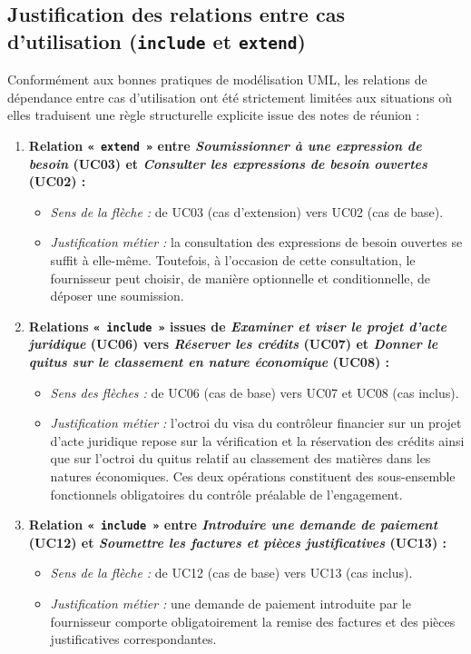 \subsection{Justification des relations entre cas d'utilisation (\texttt{include} et \texttt{extend})}

Conformément aux bonnes pratiques de modélisation UML, les relations de dépendance entre cas d'utilisation ont été strictement limitées aux situations où elles traduisent une règle structurelle explicite issue des notes de réunion :

\begin{enumerate}
  \item \textbf{Relation \texttt{« extend »} entre \emph{Soumissionner à une expression de besoin} (UC03) et \emph{Consulter les expressions de besoin ouvertes} (UC02) :}
  \begin{itemize}
    \item \emph{Sens de la flèche :} de UC03 (cas d'extension) vers UC02 (cas de base).
    \item \emph{Justification métier :} la consultation des expressions de besoin ouvertes se suffit à elle-même. Toutefois, à l'occasion de cette consultation, le fournisseur peut choisir, de manière optionnelle et conditionnelle, de déposer une soumission.
  \end{itemize}

  \item \textbf{Relations \texttt{« include »} issues de \emph{Examiner et viser le projet d'acte juridique} (UC06) vers \emph{Réserver les crédits} (UC07) et \emph{Donner le quitus sur le classement en nature économique} (UC08) :}
  \begin{itemize}
    \item \emph{Sens des flèches :} de UC06 (cas de base) vers UC07 et UC08 (cas inclus).
    \item \emph{Justification métier :} l'octroi du visa du contrôleur financier sur un projet d'acte juridique repose sur la vérification et la réservation des crédits ainsi que sur l'octroi du quitus relatif au classement des matières dans les natures économiques. Ces deux opérations constituent des sous-ensemble fonctionnels obligatoires du contrôle préalable de l'engagement.
  \end{itemize}

  \item \textbf{Relation \texttt{« include »} entre \emph{Introduire une demande de paiement} (UC12) et \emph{Soumettre les factures et pièces justificatives} (UC13) :}
  \begin{itemize}
    \item \emph{Sens de la flèche :} de UC12 (cas de base) vers UC13 (cas inclus).
    \item \emph{Justification métier :} une demande de paiement introduite par le fournisseur comporte obligatoirement la remise des factures et des pièces justificatives correspondantes.
  \end{itemize}


\end{enumerate}
